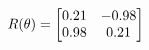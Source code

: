 \documentclass[preview]{standalone}
\begin{document}
\begin{align*}
\special{dvisvgm:raw <g id='unique000'>}R(\theta) = \begin{bmatrix}0.21 & -0.98\\0.98 & 0.21\end{bmatrix}\special{dvisvgm:raw </g>}
\end{align*}
\end{document}
